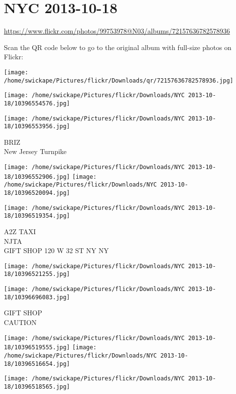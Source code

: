 \documentclass[10pt,letterpaper]{article}
\title{}
\author{}
\date{}
\begin{document}
\section*{NYC 2013-10-18}

\url{https://www.flickr.com/photos/99753978@N03/albums/72157636782578936}

Scan the QR code below to go to the original album with full-size photos on Flickr:

\texttt{[image: /home/swickape/Pictures/flickr/Downloads/qr/72157636782578936.jpg]}
\pagebreak

\texttt{[image: /home/swickape/Pictures/flickr/Downloads/NYC 2013-10-18/10396554576.jpg]}

\vspace{0.25in}
\texttt{[image: /home/swickape/Pictures/flickr/Downloads/NYC 2013-10-18/10396553956.jpg]}

BRIZ\\
New Jersey Turnpike
\pagebreak

\texttt{[image: /home/swickape/Pictures/flickr/Downloads/NYC 2013-10-18/10396552906.jpg]}
\texttt{[image: /home/swickape/Pictures/flickr/Downloads/NYC 2013-10-18/10396520094.jpg]}

\vspace{0.25in}
\texttt{[image: /home/swickape/Pictures/flickr/Downloads/NYC 2013-10-18/10396519354.jpg]}

A2Z TAXI\\
NJTA\\
GIFT SHOP 120 W 32 ST NY NY
\pagebreak

\texttt{[image: /home/swickape/Pictures/flickr/Downloads/NYC 2013-10-18/10396521255.jpg]}

\vspace{0.25in}
\texttt{[image: /home/swickape/Pictures/flickr/Downloads/NYC 2013-10-18/10396696083.jpg]}

GIFT SHOP\\
CAUTION
\pagebreak

\texttt{[image: /home/swickape/Pictures/flickr/Downloads/NYC 2013-10-18/10396519555.jpg]}
\texttt{[image: /home/swickape/Pictures/flickr/Downloads/NYC 2013-10-18/10396516654.jpg]}

\vspace{0.25in}
\texttt{[image: /home/swickape/Pictures/flickr/Downloads/NYC 2013-10-18/10396518565.jpg]}
\end{document}
